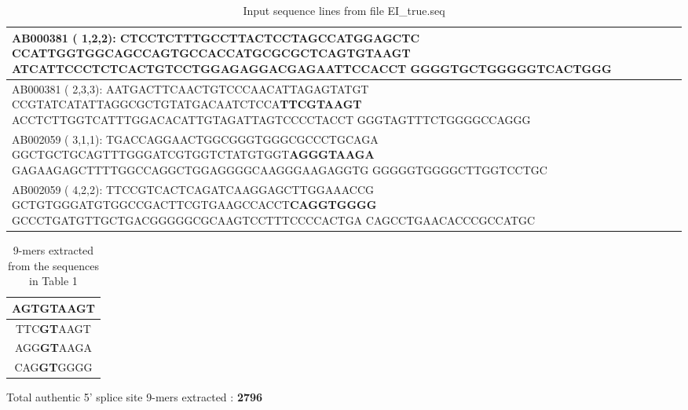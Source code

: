 \documentclass[12pt,a4paper]{article}
\begin{document}
	\begin{table}[H]
	\caption{Input sequence lines from file EI\_true.seq}
	\begin{tabular}{ | p{\linewidth} |}
		\hline
		AB000381  ( 1,2,2): CTCCTCTTTGCCTTACTCCTAGCCATGGAGCTC \newline
		CCATTGGTGGCAGCCAGTGCCACCATGCGCGCTC\textbf{AGTGTAAGT}\newline
		ATCATTCCCTCTCACTGTCCTGGAGAGGACGAGAATTCCACCT\newline
		GGGGTGCTGGGGGTCACTGGG \\
		\hline
		AB000381  ( 2,3,3): AATGACTTCAACTGTCCCAACATTAGAGTATGT \newline
		CCGTATCATATTAGGCGCTGTATGACAATCTCCA\textbf{TTCGTAAGT}\newline
		ACCTCTTGGTCATTTGGACACATTGTAGATTAGTCCCCTACCT\newline
		GGGTAGTTTCTGGGGCCAGGG \\
		\hline
        AB002059  ( 3,1,1): TGACCAGGAACTGGCGGGTGGGCGCCCTGCAGA \newline
		GGCTGCTGCAGTTTGGGATCGTGGTCTATGTGGT\textbf{AGGGTAAGA}\newline
		GAGAAGAGCTTTTGGCCAGGCTGGAGGGGCAAGGGAAGAGGTG\newline
		GGGGGTGGGGCTTGGTCCTGC \\
		\hline
		AB002059  ( 4,2,2): TTCCGTCACTCAGATCAAGGAGCTTGGAAACCG \newline
		GCTGTGGGATGTGGCCGACTTCGTGAAGCCACCT\textbf{CAGGTGGGG}\newline
		GCCCTGATGTTGCTGACGGGGGCGCAAGTCCTTTCCCCACTGA\newline
		CAGCCTGAACACCCGCCATGC \\
		\hline
	\end{tabular}
	\end{table}
	
	
	\begin{table}[H]		
		\caption{9-mers extracted from the sequences in Table 1}
		\begin{tabular}{ | c |}
			\hline
			AGT\textbf{GT}AAGT \\
			\hline
			TTC\textbf{GT}AAGT \\
			\hline
			AGG\textbf{GT}AAGA \\
			\hline
			CAG\textbf{GT}GGGG \\
			\hline
		\end{tabular}
		\centering		
	\end{table}
	
	Total authentic 5’ splice site 9-mers extracted : \textbf{2796}
	
\end{document}
